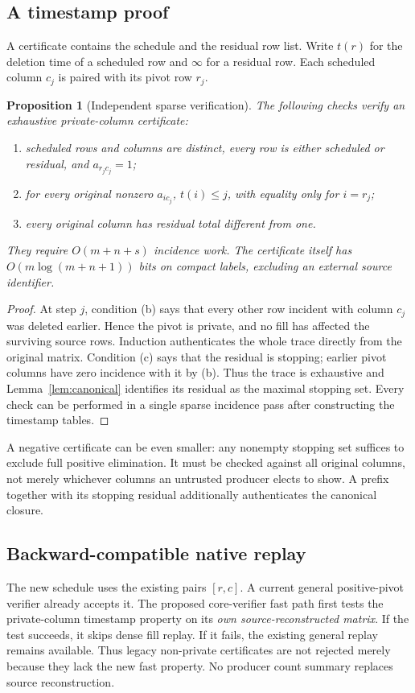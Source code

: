 \documentclass[11pt]{article}
\newtheorem{proposition}[theorem]{Proposition}
\theoremstyle{definition}\newtheorem{definition}[theorem]{Definition}
\theoremstyle{remark}\newtheorem{remark}[theorem]{Remark}
\begin{document}
\subsection{A timestamp proof}
A certificate contains the schedule and the residual row list. Write $t(r)$ for the deletion time of a scheduled row and $\infty$ for a residual row. Each scheduled column $c_j$ is paired with its pivot row $r_j$.

\begin{proposition}[Independent sparse verification]
\label{prop:checker}
The following checks verify an exhaustive private-column certificate:
\begin{enumerate}[label=(\alph*)]
\item scheduled rows and columns are distinct, every row is either scheduled or residual, and $a_{r_jc_j}=1$;
\item for every original nonzero $a_{ic_j}$, $t(i)\leq j$, with equality only for $i=r_j$;
\item every original column has residual total different from one.
\end{enumerate}
They require $O(m+n+s)$ incidence work. The certificate itself has $O(m\log(m+n+1))$ bits on compact labels, excluding an external source identifier.
\end{proposition}
\begin{proof}
At step $j$, condition (b) says that every other row incident with column $c_j$ was deleted earlier. Hence the pivot is private, and no fill has affected the surviving source rows. Induction authenticates the whole trace directly from the original matrix. Condition (c) says that the residual is stopping; earlier pivot columns have zero incidence with it by (b). Thus the trace is exhaustive and Lemma~\ref{lem:canonical} identifies its residual as the maximal stopping set. Every check can be performed in a single sparse incidence pass after constructing the timestamp tables.
\end{proof}

A negative certificate can be even smaller: any nonempty stopping set suffices to exclude full positive elimination. It must be checked against all original columns, not merely whichever columns an untrusted producer elects to show. A prefix together with its stopping residual additionally authenticates the canonical closure.

\subsection{Backward-compatible native replay}
The new schedule uses the existing pairs $[r,c]$. A current general positive-pivot verifier already accepts it. The proposed core-verifier fast path first tests the private-column timestamp property on its \emph{own source-reconstructed matrix}. If the test succeeds, it skips dense fill replay. If it fails, the existing general replay remains available. Thus legacy non-private certificates are not rejected merely because they lack the new fast property. No producer count summary replaces source reconstruction.
\end{document}
